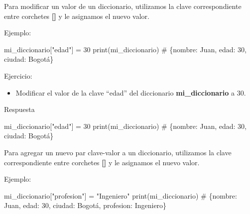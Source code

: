 \documentclass[
  a4paper,
  DIV=11,
  numbers=noendperiod,
  onepage,
  openany]{scrreprt}
\newenvironment{Shaded}{\begin{snugshade}}{\end{snugshade}}
\newcommand{\BuiltInTok}[1]{\textcolor[rgb]{0.00,0.23,0.31}{#1}}
\newcommand{\CommentTok}[1]{\textcolor[rgb]{0.37,0.37,0.37}{#1}}
\newcommand{\DecValTok}[1]{\textcolor[rgb]{0.68,0.00,0.00}{#1}}
\newcommand{\NormalTok}[1]{\textcolor[rgb]{0.00,0.23,0.31}{#1}}
\newcommand{\OperatorTok}[1]{\textcolor[rgb]{0.37,0.37,0.37}{#1}}
\newcommand{\StringTok}[1]{\textcolor[rgb]{0.13,0.47,0.30}{#1}}
\providecommand{\tightlist}{%
  \setlength{\itemsep}{0pt}\setlength{\parskip}{0pt}}\usepackage{longtable,booktabs,array}
\begin{document}
Para modificar un valor de un diccionario, utilizamos la clave
correspondiente entre corchetes \textbf{{[}{]}} y le asignamos el nuevo
valor.

Ejemplo:

\begin{Shaded}
\begin{Highlighting}[]
\NormalTok{mi\_diccionario[}\StringTok{"edad"}\NormalTok{] }\OperatorTok{=} \DecValTok{30}
\BuiltInTok{print}\NormalTok{(mi\_diccionario)  }\CommentTok{\# \{\textquotesingle{}nombre\textquotesingle{}: \textquotesingle{}Juan\textquotesingle{}, \textquotesingle{}edad\textquotesingle{}: 30, \textquotesingle{}ciudad\textquotesingle{}: \textquotesingle{}Bogotá\textquotesingle{}\}}
\end{Highlighting}
\end{Shaded}

Ejercicio:

\begin{itemize}
\tightlist
\item
  Modificar el valor de la clave ``edad'' del diccionario
  \textbf{mi\_diccionario} a 30.
\end{itemize}

Respuesta

\begin{Shaded}
\begin{Highlighting}[]
\NormalTok{mi\_diccionario[}\StringTok{"edad"}\NormalTok{] }\OperatorTok{=} \DecValTok{30}
\BuiltInTok{print}\NormalTok{(mi\_diccionario)  }\CommentTok{\# \{\textquotesingle{}nombre\textquotesingle{}: \textquotesingle{}Juan\textquotesingle{}, \textquotesingle{}edad\textquotesingle{}: 30, \textquotesingle{}ciudad\textquotesingle{}: \textquotesingle{}Bogotá\textquotesingle{}\}}
\end{Highlighting}
\end{Shaded}

Para agregar un nuevo par clave-valor a un diccionario, utilizamos la
clave correspondiente entre corchetes \textbf{{[}{]}} y le asignamos el
nuevo valor.

Ejemplo:

\begin{Shaded}
\begin{Highlighting}[]
\NormalTok{mi\_diccionario[}\StringTok{"profesion"}\NormalTok{] }\OperatorTok{=} \StringTok{"Ingeniero"}
\BuiltInTok{print}\NormalTok{(mi\_diccionario)  }\CommentTok{\# \{\textquotesingle{}nombre\textquotesingle{}: \textquotesingle{}Juan\textquotesingle{}, \textquotesingle{}edad\textquotesingle{}: 30, \textquotesingle{}ciudad\textquotesingle{}: \textquotesingle{}Bogotá\textquotesingle{}, \textquotesingle{}profesion\textquotesingle{}: \textquotesingle{}Ingeniero\textquotesingle{}\}}
\end{Highlighting}
\end{Shaded}
\end{document}
